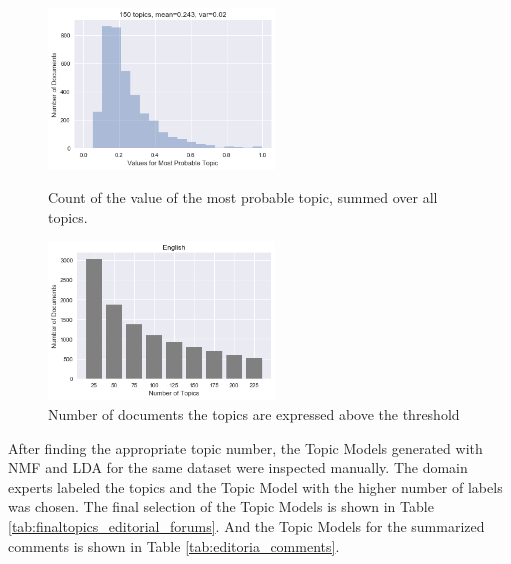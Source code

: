 	
\begin{figure}
	\centering
	\begin{minipage}[b]{0.5\textwidth}
		\includegraphics[width=6cm]{gfx/Hyperparams/150topics_English_nmf.png}
		\caption{Count of the value of the most probable topic, summed over all topics.}
		\label{fig:mean}%
	\end{minipage}%
	\begin{minipage}[b]{0.5\textwidth}
		\includegraphics[width=6cm]{gfx/Hyperparams/English_nmf_Comments.png}
		\caption{Number of documents the topics are expressed above the threshold}
		\label{fig:topic number}
	\end{minipage}%
\end{figure}	

After finding the appropriate topic number, the Topic Models generated with \ac{NMF} and \ac{LDA} for the same dataset were inspected manually. The domain experts labeled the topics and the Topic Model with the higher number of labels was chosen. The final selection of the Topic Models is shown in Table \ref{tab:finaltopics_editorial_forums}. And the Topic Models for the summarized comments is shown in Table \ref{tab:editoria_comments}. \\


